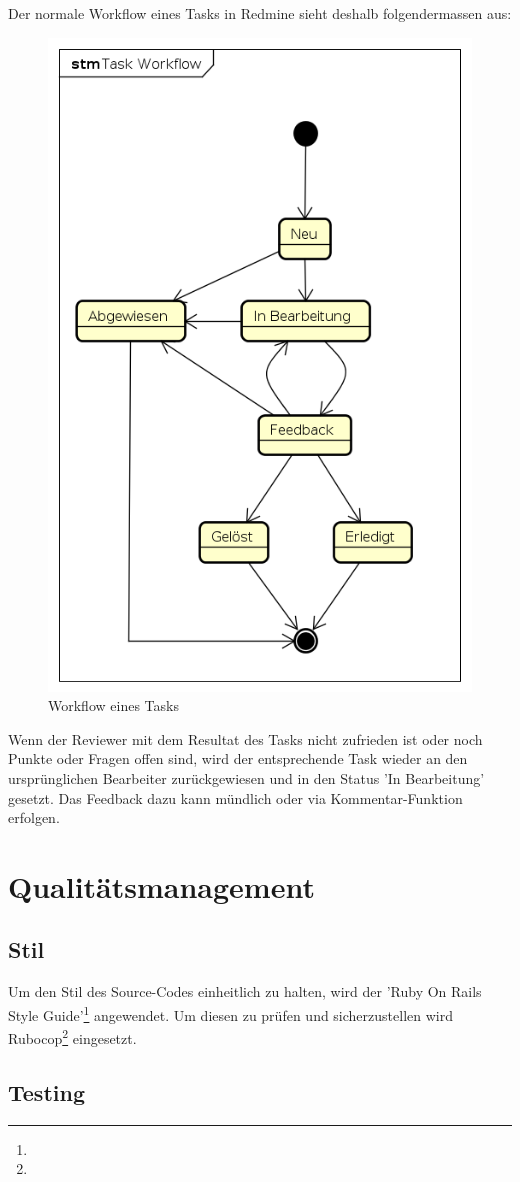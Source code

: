Der normale Workflow eines Tasks in Redmine sieht deshalb folgendermassen aus:

\begin{figure}[H]
	\centering
	\includegraphics[width=0.5\linewidth]{fig/task_workflow}
	\caption{Workflow eines Tasks}
	\label{fig:pm:workflow}
\end{figure}

Wenn der Reviewer mit dem Resultat des Tasks nicht zufrieden ist oder noch Punkte oder Fragen offen sind, wird der entsprechende Task wieder an den ursprünglichen Bearbeiter zurückgewiesen und in den Status 'In Bearbeitung' gesetzt. Das Feedback dazu kann mündlich oder via Kommentar-Funktion erfolgen.

\section{Qualitätsmanagement}

\subsection*{Stil}

Um den Stil des Source-Codes einheitlich zu halten, wird der 'Ruby On Rails Style Guide'\footnote{} angewendet. Um diesen zu prüfen und sicherzustellen wird Rubocop\footnote{} eingesetzt.

\subsection*{Testing}

